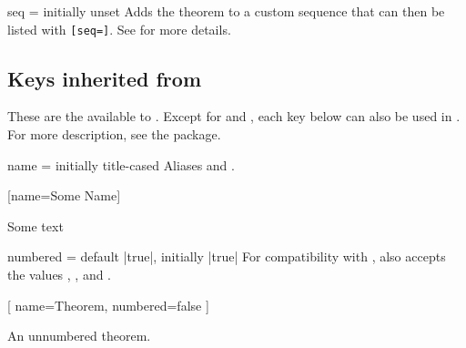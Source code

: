 \documentclass{ltxdoc}
\newcommand{\bracks}[1]{\texttt{[#1]}}
\begin{document}
\begin{docKey}[][doc label=thm/seq]{seq}
  {=}
  {initially unset}
Adds the theorem to a custom sequence  that can then be listed with \bracks{seq=}. See  for more details.
\end{docKey}

\subsection{Keys inherited from } \label{thm-thmtools-keys}

These are the  available to . Except for  and , each key below can also be used in . For more description, see the \href{https://ctan.org/pkg/thmtools}{} package.

\begin{docKey}[][doc label=thm/name]{name}
  {=}
  {initially title-cased }
Aliases  and .

\begin{tcbwritetemp}
[name=Some Name]
\end{tcbwritetemp}

\begin{keythmscode}[withpreamble]
\begin{mythm}
Some text
\end{mythm}
\end{keythmscode}

\end{docKey}

\begin{docKey}{numbered}
  {=\textbar{}\textbar {}}
  {default |true|, initially |true|}
For compatibility with , also accepts the values , , and .

\begin{tcbwritetemp}
[
  name=Theorem, numbered=false
  ]
\end{tcbwritetemp}

\begin{keythmscode}[withpreamble]
\begin{theorem*}
An unnumbered theorem.
\end{theorem*}
\end{keythmscode}

\end{docKey}
\end{document}
